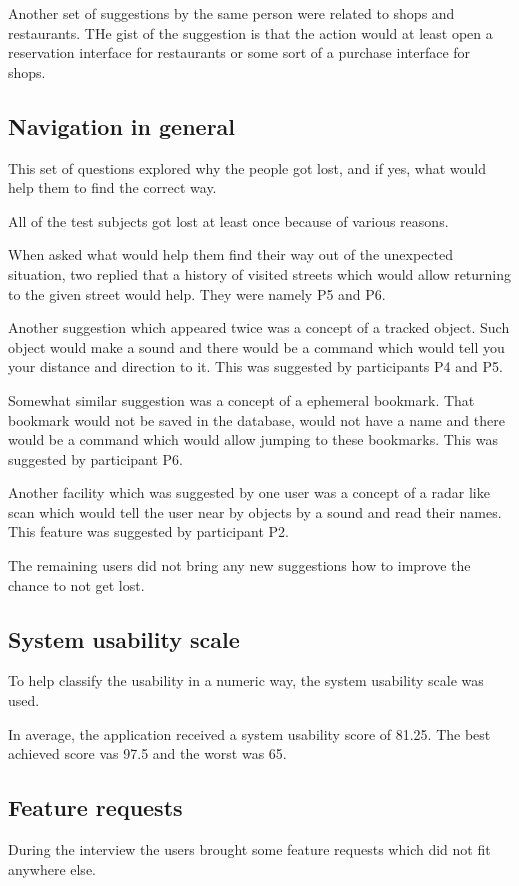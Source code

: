 \documentclass[nolof,digital]{fithesis3}
\begin{document}
Another  set of suggestions by the same person were related to shops and restaurants. THe gist of the suggestion is that the action would at least open a reservation interface for restaurants or some sort of a purchase interface for shops.
\subsection{Navigation in general}
This set of questions explored why the people got lost, and if yes, what would help them to find the correct way.

All of the test subjects got lost at least once because of various reasons.

When asked what would help them find their way out of the unexpected situation, two replied that a history of visited streets which would allow returning to the given street would help. They were namely P5 and P6.

Another suggestion which appeared twice was a concept of a tracked object. Such object would make a sound and there would be a command which would tell you your distance and direction to it. This was suggested by participants P4 and P5.

Somewhat similar suggestion was a concept of a ephemeral bookmark. That bookmark would not be saved in the database, would not have a name and there would be a command which would allow jumping to these bookmarks. This was suggested by participant P6.

Another facility which was suggested by one user was a concept of a radar like scan which would tell the user near by objects by a sound and read their names. This feature was suggested by participant P2.

The  remaining users did not bring any new suggestions how to improve the chance to not get lost.
\subsection{System usability scale}
To help classify the usability in a numeric way, the system usability scale was used.

In average, the application received a system usability score of 81.25. The best achieved score vas 97.5 and the worst was 65.

\subsection{Feature requests}
During the interview the users brought some feature requests which did not fit anywhere else.
\end{document}
